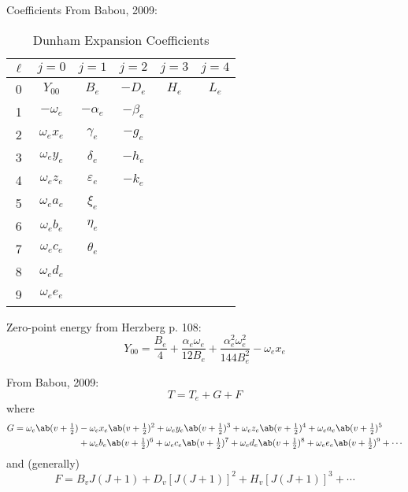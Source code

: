 \documentclass[11pt, twoside, fleqn]{report}
\begin{document}
Coefficients From Babou, 2009:
\begin{table}[H]
    \centering
    \caption{Dunham Expansion Coefficients}
    \begin{tabular}{c|ccccc}
        \toprule
        $\ell$ & $j = 0$           & $j = 1$           & $j = 2$      & $j = 3$ & $j = 4$ \\
        \midrule
        0      & $Y_{00}$          & $B_{e}$           & $-D_{e}$     & $H_{e}$ & $L_{e}$ \\
        1      & $-\omega_{e}$     & $-\alpha_{e}$     & $-\beta_{e}$ &         &         \\
        2      & $\omega_{e}x_{e}$ & $\gamma_{e}$      & $-g_{e}$     &         &         \\
        3      & $\omega_{e}y_{e}$ & $\delta_{e}$      & $-h_{e}$     &         &         \\
        4      & $\omega_{e}z_{e}$ & $\varepsilon_{e}$ & $-k_{e}$     &         &         \\
        5      & $\omega_{e}a_{e}$ & $\xi_{e}$         &              &         &         \\
        6      & $\omega_{e}b_{e}$ & $\eta_{e}$        &              &         &         \\
        7      & $\omega_{e}c_{e}$ & $\theta_{e}$      &              &         &         \\
        8      & $\omega_{e}d_{e}$ &                   &              &         &         \\
        9      & $\omega_{e}e_{e}$ &                   &              &         &         \\
        \bottomrule
    \end{tabular}
\end{table}

Zero-point energy from Herzberg p. 108:
\begin{equation*}
    Y_{00} = \frac{B_{e}}{4} + \frac{\alpha_{e}\omega_{e}}{12B_{e}} + \frac{\alpha_{e}^{2}\omega_{e}^{2}}{144B_{e}^{2}} - \omega_{e}x_{e}
\end{equation*}

From Babou, 2009:
\begin{equation*}
    T = T_{e} + G + F
\end{equation*}
where
\begin{align*}
    G = \omega_{e}\ab(v + \tfrac{1}{2}) & - \omega_{e}x_{e}\ab(v + \tfrac{1}{2})^{2} + \omega_{e}y_{e}\ab(v + \tfrac{1}{2})^{3} + \omega_{e}z_{e}\ab(v + \tfrac{1}{2})^{4} + \omega_{e}a_{e}\ab(v + \tfrac{1}{2})^{5}          \\
                                        & + \omega_{e}b_{e}\ab(v + \tfrac{1}{2})^{6} + \omega_{e}c_{e}\ab(v + \tfrac{1}{2})^{7} + \omega_{e}d_{e}\ab(v + \tfrac{1}{2})^{8} + \omega_{e}e_{e}\ab(v + \tfrac{1}{2})^{9} + \dotsb
\end{align*}
and (generally)
\begin{equation*}
    F = B_{v}J(J + 1) + D_{v}[J(J + 1)]^{2} + H_{v}[J(J + 1)]^{3} + \dotsb
\end{equation*}
\end{document}
